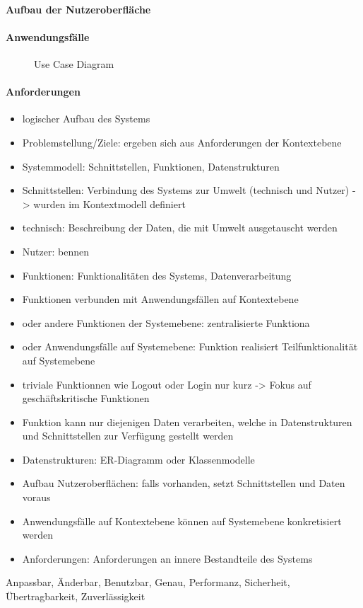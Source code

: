 \paragraph{Aufbau der Nutzeroberfläche}
\paragraph{Anwendungsfälle}

\begin{figure}[ht!]
  \centering
  \noindent{}
  \caption[Use Case Diagram]{Use Case Diagram}
  \label{usecasediagram}
\end{figure}
\paragraph{Anforderungen}

\begin{itemize}
  \item logischer Aufbau des Systems
  \item Problemstellung/Ziele: ergeben sich aus Anforderungen der Kontextebene
  \item Systemmodell: Schnittstellen, Funktionen, Datenstrukturen
  \item Schnittstellen: Verbindung des Systems zur Umwelt (technisch und Nutzer) -> wurden im Kontextmodell definiert
  \item technisch: Beschreibung der Daten, die mit Umwelt ausgetauscht werden
  \item Nutzer: bennen
  \item Funktionen: Funktionalitäten des Systems, Datenverarbeitung
  \item Funktionen verbunden mit Anwendungsfällen auf Kontextebene
  \item oder andere Funktionen der Systemebene: zentralisierte Funktiona
  \item oder Anwendungsfälle auf Systemebene: Funktion realisiert Teilfunktionalität auf Systemebene
  \item triviale Funktionnen wie Logout oder Login nur kurz -> Fokus auf geschäftskritische Funktionen
  \item Funktion kann nur diejenigen Daten verarbeiten, welche in Datenstrukturen und Schnittstellen zur Verfügung gestellt werden
  \item Datenstrukturen: ER-Diagramm oder Klassenmodelle
  \item Aufbau Nutzeroberflächen: falls vorhanden, setzt Schnittstellen und Daten voraus
  \item Anwendungsfälle auf Kontextebene können auf Systemebene konkretisiert werden
  \item Anforderungen: Anforderungen an innere Bestandteile des Systems
\end{itemize}
Anpassbar, Änderbar, Benutzbar, Genau, Performanz, Sicherheit, Übertragbarkeit, Zuverlässigkeit

